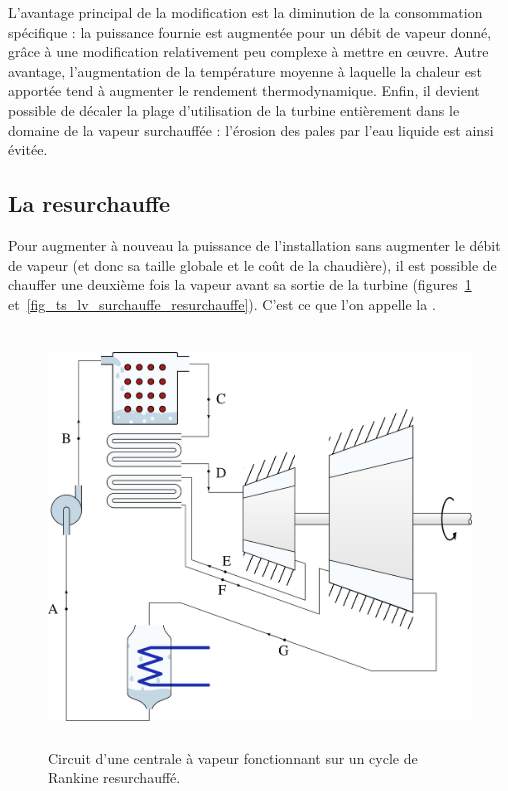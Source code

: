 		L’avantage principal de la modification est la diminution de la consommation spécifique : la puissance fournie est augmentée pour un débit de vapeur donné, grâce à une modification relativement peu complexe à mettre en œuvre. Autre avantage, l’augmentation de la température moyenne à laquelle la chaleur est apportée tend à augmenter le rendement thermodynamique. Enfin, il devient possible de décaler la plage d’utilisation de la turbine entièrement dans le domaine de la vapeur surchauffée : l’érosion des pales par l’eau liquide est ainsi évitée.


	\subsection{La resurchauffe}
	\label{ch_resurchauffe}

		Pour augmenter à nouveau la puissance de l’installation sans augmenter le débit de vapeur (et donc sa taille globale et le coût de la chaudière), il est possible de chauffer une deuxième fois la vapeur avant sa sortie de la turbine (figures~\ref{fig_cycle_resurchauffe} et~\ref{fig_ts_lv_surchauffe_resurchauffe}). C’est ce que l’on appelle la .

		\begin{figure}
			\begin{center}
				\includegraphics[height=11cm]{images/circuit_surchauffe_resurchauffe.png}
			\end{center}
			\caption{Circuit d’une centrale à vapeur fonctionnant sur un cycle de Rankine resurchauffé.}
			\label{fig_cycle_resurchauffe}
		\end{figure}

